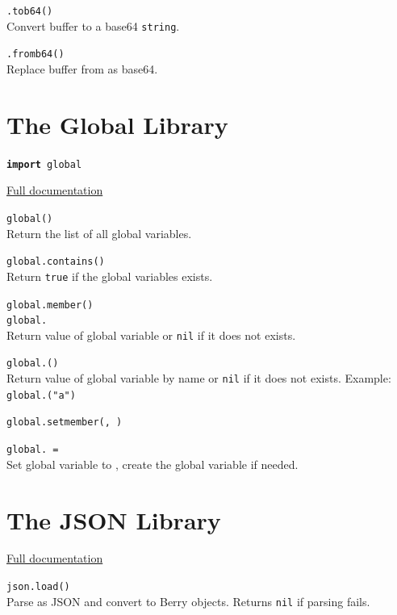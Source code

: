 \hangpar {}\texttt{.tob64()}\\
Convert  buffer to a base64 \texttt{string}.

\hangpar {}\texttt{.fromb64(}\texttt{)}\\
Replace  buffer from  as base64.

\section*{The Global Library}

\hangpar \texttt{\textbf{import} global}

\hangpar \href{https://berry.readthedocs.io/en/latest/source/en/Chapter-7.html\#module-global}{Full documentation}

\hangpar \texttt{global()}\\
Return the list of all global variables.

\hangpar \texttt{global.contains(}\texttt{)} \\
Return \texttt{true} if the global variables exists.

\hangpartwo \texttt{global.member(}\texttt{)}\\
\texttt{global.} \\	
Return value of global variable  or \texttt{nil} if it does not exists.

\hangpar \texttt{global.(}\texttt{)} \\
Return value of global variable  by name or \texttt{nil} if it does not exists. Example: \texttt{global.("a")}

\hangpar \texttt{global.setmember(}\texttt{, }\texttt{)}

\hangpar \texttt{global.}\texttt{ = } \\
Set global variable  to , create the global variable if needed.

\section*{The JSON Library}

\hangpar \href{https://berry.readthedocs.io/en/latest/source/en/Chapter-7.html\#json-module}{Full documentation}

\hangpar \texttt{json.load(}\texttt{)} \\
Parse  as JSON and convert to Berry objects. Returns \texttt{nil} if parsing fails.

